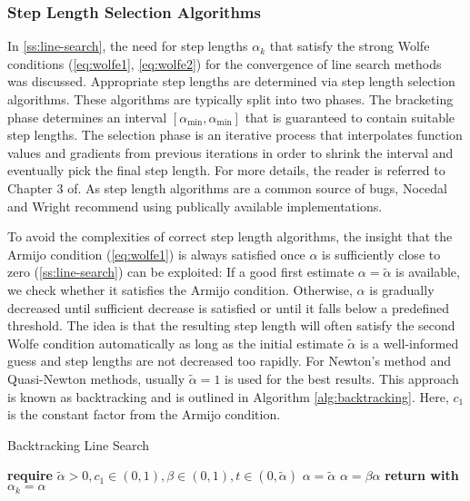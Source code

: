 \subsubsection{Step Length Selection Algorithms}\label{sss:step-length-selection}
In \cref{ss:line-search}, the need for step lengths $\alpha_k$ that satisfy the strong Wolfe conditions (\cref{eq:wolfe1}, \cref{eq:wolfe2})
for the convergence of line search methods was discussed. Appropriate step lengths are determined via step length selection algorithms. 
These algorithms are typically
split into two phases. The bracketing phase determines an interval $[\alpha_{\text{min}}, \alpha_{\text{min}}]$ that is 
guaranteed to contain suitable step lengths. The selection phase is an iterative process that interpolates function values and gradients 
from previous iterations in order to shrink the interval and eventually pick the final step length. For more details, the reader is 
referred to Chapter 3 of. As step length algorithms are a common source of bugs, Nocedal and Wright recommend using publically 
available implementations.

To avoid the complexities of correct step length algorithms, the insight that the Armijo condition (\cref{eq:wolfe1}) is always satisfied 
once $\alpha$ is sufficiently close to zero (\cref{ss:line-search}) can be exploited: If a good first estimate $\alpha = 
\tilde{\alpha}$ is available,
we check whether it satisfies the Armijo condition. Otherwise, $\alpha$ is gradually decreased until sufficient decrease is satisfied or until
it falls below a predefined threshold. The idea is that the resulting step length will often satisfy the second Wolfe condition automatically 
as long as the initial estimate $\tilde{\alpha}$ is a well-informed guess and step lengths are not decreased too rapidly. For Newton's method
and Quasi-Newton methods, usually $\tilde{\alpha} = 1$ is used for the best results. This approach is known
as backtracking and is outlined in Algorithm \ref{alg:backtracking}. Here, $c_1$ is the constant factor from the Armijo condition.

\begin{algorithm}
\caption{Backtracking Line Search}\label{alg:backtracking}
\begin{algorithmic}
\State \textbf{require } $\tilde{\alpha} > 0, c_1 \in (0, 1), \beta \in (0, 1), t \in (0, \tilde{\alpha})$
\State $\alpha = \tilde{\alpha}$
\State $\alpha = \beta \alpha$
\EndWhile
\State \textbf{return with } $\alpha_k = \alpha$
\EndProcedure
\end{algorithmic}
\end{algorithm}


